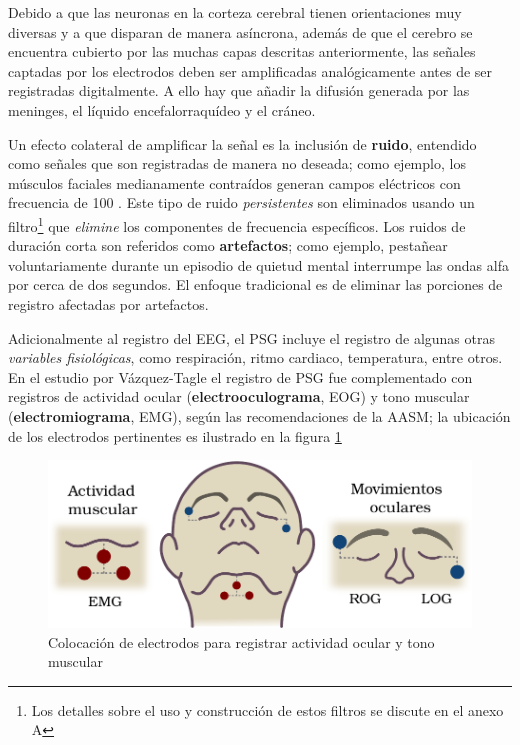 Debido a que las neuronas en la corteza cerebral tienen orientaciones muy diversas y a que disparan 
de manera asíncrona, además de que el cerebro se encuentra cubierto por las muchas capas descritas
anteriormente, las señales captadas por los electrodos deben ser amplificadas analógicamente antes 
de ser registradas digitalmente.
A ello hay que añadir la difusión generada por las meninges, el líquido encefalorraquídeo y el 
cráneo.

%
%
Un efecto colateral de amplificar la señal es la inclusión de \textbf{ruido}, entendido como 
señales que son registradas de manera no deseada; como ejemplo, los músculos faciales medianamente 
contraídos generan campos eléctricos con frecuencia de 100 \hz.
Este tipo de ruido \textit{persistentes} son eliminados usando un filtro\footnote{Los detalles 
sobre el uso y construcción de estos filtros se discute en el anexo A} que \textit{elimine} los 
componentes de frecuencia específicos.
Los ruidos de duración corta son referidos como \textbf{artefactos}; como ejemplo,
pestañear voluntariamente durante un episodio de quietud mental interrumpe las ondas alfa por cerca 
de dos segundos. El enfoque tradicional es de eliminar las porciones de registro afectadas por 
artefactos.

Adicionalmente al registro del EEG, el PSG incluye el registro de algunas otras \textit{variables 
fisiológicas}, como respiración, ritmo cardiaco, temperatura, entre otros. En el estudio por 
Vázquez-Tagle el registro de PSG fue complementado con registros de actividad ocular 
(\textbf{electrooculograma}, EOG) y tono muscular (\textbf{electromiograma}, EMG), según las 
recomendaciones de la AASM; la ubicación de los electrodos pertinentes es ilustrado en la
figura \ref{emg_eog}

\begin{figure}
\centering
\includegraphics[width=\linewidth]
{./img_diagramas/emg_eog_v3.pdf}
\caption{Colocación de electrodos para registrar actividad ocular y tono muscular}
\label{emg_eog}
\end{figure}

